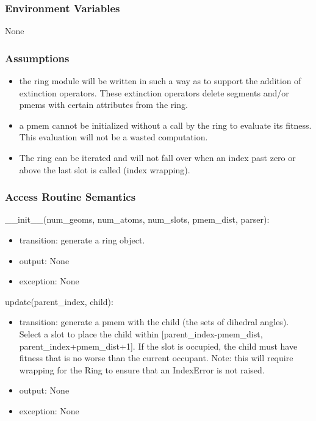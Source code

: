 \documentclass[12pt, titlepage]{article}
\begin{document}
\subsubsection{Environment Variables}

None

\subsubsection{Assumptions}

\begin{itemize}
	\item the ring module will be written in such a way as to support the 
	addition of extinction operators. These extinction operators delete 
	segments and/or pmems with certain attributes from the ring.
	\item a pmem cannot be initialized without a call by the ring to evaluate 
	its fitness. This evaluation will not be a wasted computation.
	\item The ring can be iterated and will not fall over when an index past 
	zero or above the last slot is called (index wrapping).
\end{itemize}

\subsubsection{Access Routine Semantics}

\noindent \_\_init\_\_(num\_geoms, num\_atoms, num\_slots, pmem\_dist, parser):
\begin{itemize}
	\item transition: generate a ring object.
	\item output: None
	\item exception: None
\end{itemize}

\noindent update(parent\_index, child):
\begin{itemize}
	\item transition: generate a pmem with the child (the sets of dihedral 
	angles). Select a slot to place the child within [parent\_index-pmem\_dist, 
	parent\_index+pmem\_dist+1]. If the slot is occupied, the child 
	must have fitness that is no worse than the current occupant. Note: this 
	will require wrapping for the Ring to ensure that an IndexError is not 
	raised.
	\item output: None
	\item exception: None
\end{itemize}
\end{document}
